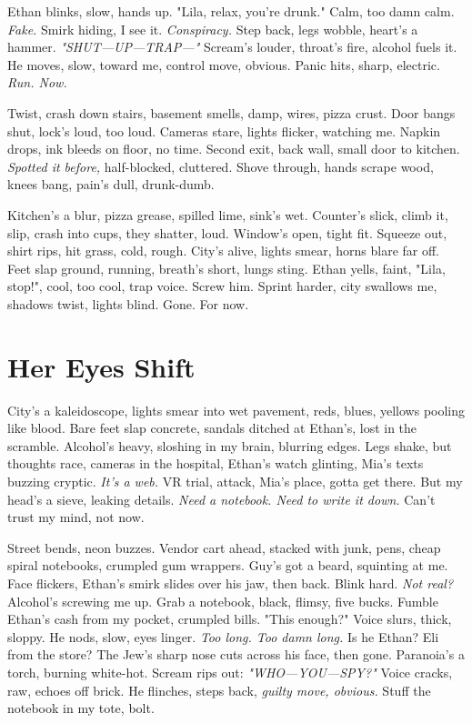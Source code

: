 \documentclass[12pt]{article} %
\begin{document}
\textnormal{Ethan} blinks, slow, hands up. "Lila, relax, you’re drunk." Calm, too damn calm. \textit{Fake.} Smirk hiding, I see it. \textit{Conspiracy.} Step back, legs wobble, heart’s a hammer. \textit{"SHUT—UP—TRAP—"} Scream’s louder, throat’s fire, alcohol fuels it. He moves, slow, toward me, control move, obvious. Panic hits, sharp, electric. \textit{Run. Now.}

Twist, crash down stairs, basement smells, damp, wires, pizza crust. Door bangs shut, lock’s loud, too loud. Cameras stare, lights flicker, watching me. Napkin drops, ink bleeds on floor, no time. Second exit, back wall, small door to kitchen. \textit{Spotted it before,} half-blocked, cluttered. Shove through, hands scrape wood, knees bang, pain’s dull, drunk-dumb.

Kitchen’s a blur, pizza grease, spilled lime, sink’s wet. Counter’s slick, climb it, slip, crash into cups, they shatter, loud. Window’s open, tight fit. Squeeze out, shirt rips, hit grass, cold, rough. City’s alive, lights smear, horns blare far off. Feet slap ground, running, breath’s short, lungs sting. \textnormal{Ethan} yells, faint, "Lila, stop!", cool, too cool, trap voice. Screw him. Sprint harder, city swallows me, shadows twist, lights blind. Gone. For now.

\section{Her Eyes Shift}

City’s a kaleidoscope, lights smear into wet pavement, reds, blues, yellows pooling like blood. Bare feet slap concrete, sandals ditched at \textnormal{Ethan}’s, lost in the scramble. Alcohol’s heavy, sloshing in my brain, blurring edges. Legs shake, but thoughts race, cameras in the hospital, \textnormal{Ethan}’s watch glinting, \textnormal{Mia}’s texts buzzing cryptic. \textit{It’s a web.} VR trial, attack, \textnormal{Mia}’s place, gotta get there. But my head’s a sieve, leaking details. \textit{Need a notebook. Need to write it down.} Can’t trust my mind, not now.

Street bends, neon buzzes. Vendor cart ahead, stacked with junk, pens, cheap spiral notebooks, crumpled gum wrappers. Guy’s got a beard, squinting at me. Face flickers, \textnormal{Ethan}’s smirk slides over his jaw, then back. Blink hard. \textit{Not real?} Alcohol’s screwing me up. Grab a notebook, black, flimsy, five bucks. Fumble \textnormal{Ethan}’s cash from my pocket, crumpled bills. "This enough?" Voice slurs, thick, sloppy. He nods, slow, eyes linger. \textit{Too long. Too damn long.} Is he \textnormal{Ethan}? \textnormal{Eli} from the store? The Jew’s sharp nose cuts across his face, then gone. Paranoia’s a torch, burning white-hot. Scream rips out: \textit{"WHO—YOU—SPY?"} Voice cracks, raw, echoes off brick. He flinches, steps back, \textit{guilty move, obvious.} Stuff the notebook in my tote, bolt.
\end{document}
